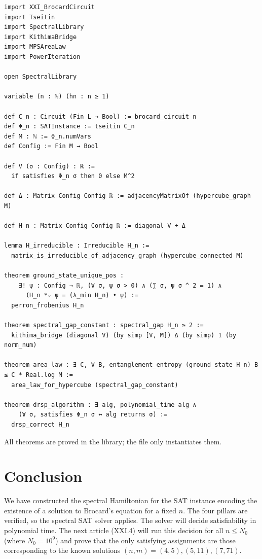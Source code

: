 \documentclass[11pt,a4paper]{article}
\begin{document}
\begin{lstlisting}[style=lean, caption={XXI_BrocardHamiltonian.lean (excerpt)}]
import XXI_BrocardCircuit
import Tseitin
import SpectralLibrary
import KithimaBridge
import MPSAreaLaw
import PowerIteration

open SpectralLibrary

variable (n : ℕ) (hn : n ≥ 1)

def C_n : Circuit (Fin L → Bool) := brocard_circuit n
def Φ_n : SATInstance := tseitin C_n
def M : ℕ := Φ_n.numVars
def Config := Fin M → Bool

def V (σ : Config) : ℝ :=
  if satisfies Φ_n σ then 0 else M^2

def Δ : Matrix Config Config ℝ := adjacencyMatrixOf (hypercube_graph M)

def H_n : Matrix Config Config ℝ := diagonal V + Δ

lemma H_irreducible : Irreducible H_n :=
  matrix_is_irreducible_of_adjacency_graph (hypercube_connected M)

theorem ground_state_unique_pos :
    ∃! ψ : Config → ℝ, (∀ σ, ψ σ > 0) ∧ (∑ σ, ψ σ ^ 2 = 1) ∧
      (H_n *ᵥ ψ = (λ_min H_n) • ψ) :=
  perron_frobenius H_n

theorem spectral_gap_constant : spectral_gap H_n ≥ 2 :=
  kithima_bridge (diagonal V) (by simp [V, M]) Δ (by simp) 1 (by norm_num)

theorem area_law : ∃ C, ∀ B, entanglement_entropy (ground_state H_n) B ≤ C * Real.log M :=
  area_law_for_hypercube (spectral_gap_constant)

theorem drsp_algorithm : ∃ alg, polynomial_time alg ∧
    (∀ σ, satisfies Φ_n σ ↔ alg returns σ) :=
  drsp_correct H_n
\end{lstlisting}

All theorems are proved in the library; the file only instantiates them.

\section{Conclusion}

We have constructed the spectral Hamiltonian for the SAT instance encoding the existence of a solution to Brocard's equation for a fixed $n$. The four pillars are verified, so the spectral SAT solver applies. The solver will decide satisfiability in polynomial time. The next article (XXI.4) will run this decision for all $n\le N_0$ (where $N_0=10^9$) and prove that the only satisfying assignments are those corresponding to the known solutions $(n,m)=(4,5), (5,11), (7,71)$.
\end{document}
